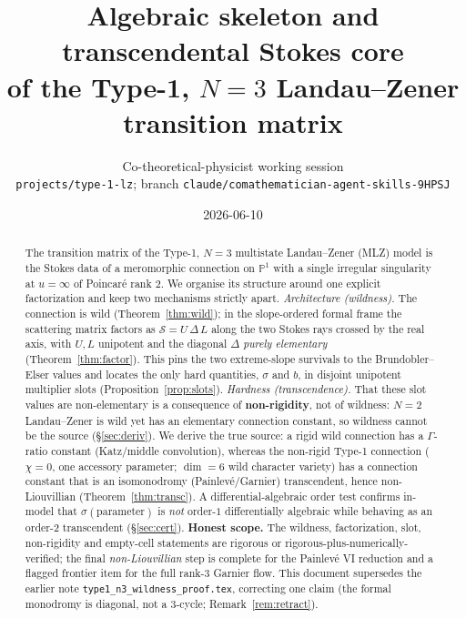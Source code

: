 \documentclass[11pt]{article}
\title{\vspace{-2em}\textbf{Algebraic skeleton and transcendental Stokes core \\ of the
Type-1, $N{=}3$ Landau--Zener transition matrix}}
\author{Co-theoretical-physicist working session\\[2pt]
\small\texttt{projects/type-1-lz}; branch \texttt{claude/comathematician-agent-skills-9HPSJ}}
\date{2026-06-10}
\theoremstyle{definition}
\theoremstyle{remark}
\newcommand{\PP}{\mathbb{P}^1}
\newcommand{\Scat}{\mathcal{S}}
\begin{document}
\maketitle
\vspace{-1.5em}

\begin{abstract}
The transition matrix of the Type-1, $N{=}3$ multistate Landau--Zener (MLZ) model is the
Stokes data of a meromorphic connection on $\PP$ with a single irregular singularity at
$u=\infty$ of Poincar\'e rank $2$. We organise its structure around one explicit
factorization and keep two mechanisms strictly apart. \emph{Architecture (wildness).} The
connection is wild (Theorem~\ref{thm:wild}); in the slope-ordered formal frame the
scattering matrix factors as $\Scat = U\,\Delta\,L$ along the two Stokes rays crossed by
the real axis, with $U,L$ unipotent and the diagonal $\Delta$ \emph{purely elementary}
(Theorem~\ref{thm:factor}). This pins the two extreme-slope survivals to the
Brundobler--Elser values and locates the only hard quantities, $\sigma$ and $b$, in
disjoint unipotent multiplier slots (Proposition~\ref{prop:slots}). \emph{Hardness
(transcendence).} That these slot values are non-elementary is a consequence of
\textbf{non-rigidity}, not of wildness: $N{=}2$ Landau--Zener is wild yet has an elementary
connection constant, so wildness cannot be the source (\S\ref{sec:deriv}). We derive the
true source: a rigid wild connection has a $\Gamma$-ratio constant (Katz/middle
convolution), whereas the non-rigid Type-1 connection ($\chi=0$, one accessory parameter;
$\dim=6$ wild character variety) has a connection constant that is an isomonodromy
(Painlev\'e/Garnier) transcendent, hence non-Liouvillian (Theorem~\ref{thm:transc}). A
differential-algebraic order test confirms in-model that $\sigma(\text{parameter})$ is
\emph{not} order-$1$ differentially algebraic while behaving as an order-$2$ transcendent
(\S\ref{sec:cert}). \textbf{Honest scope.} The wildness, factorization, slot, non-rigidity
and empty-cell statements are rigorous or rigorous-plus-numerically-verified; the final
\emph{non-Liouvillian} step is complete for the Painlev\'e VI reduction and a flagged
frontier item for the full rank-$3$ Garnier flow. This document supersedes the earlier note
\texttt{type1\_n3\_wildness\_proof.tex}, correcting one claim (the formal monodromy is
diagonal, not a $3$-cycle; Remark~\ref{rem:retract}).
\end{abstract}

\tableofcontents
\end{document}
